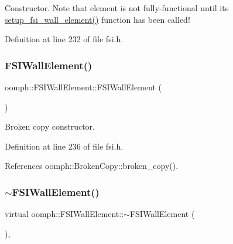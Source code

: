 Constructor. Note that element is not fully-\/functional until its \hyperlink{classoomph_1_1FSIWallElement_a487a050241512f3979c4d67bb40b2a63}{setup\+\_\+fsi\+\_\+wall\+\_\+element()} function has been called! 



Definition at line 232 of file fsi.\+h.

\mbox{\label{classoomph_1_1FSIWallElement_a57f70b2c656281853592a0163fa16268}} 
\subsubsection{\texorpdfstring{F\+S\+I\+Wall\+Element()}{FSIWallElement()}\hspace{0.1cm}{\footnotesize\ttfamily [2/2]}}
{\footnotesize\ttfamily oomph\+::\+F\+S\+I\+Wall\+Element\+::\+F\+S\+I\+Wall\+Element (\begin{DoxyParamCaption}\item[{const \hyperlink{classoomph_1_1FSIWallElement}{F\+S\+I\+Wall\+Element} \&}]{ }\end{DoxyParamCaption})\hspace{0.3cm}{\ttfamily [inline]}}



Broken copy constructor. 



Definition at line 236 of file fsi.\+h.



References oomph\+::\+Broken\+Copy\+::broken\+\_\+copy().

\mbox{\label{classoomph_1_1FSIWallElement_a498254a4b31cfee252a2015a754b03df}} 
\subsubsection{\texorpdfstring{$\sim$\+F\+S\+I\+Wall\+Element()}{~FSIWallElement()}}
{\footnotesize\ttfamily virtual oomph\+::\+F\+S\+I\+Wall\+Element\+::$\sim$\+F\+S\+I\+Wall\+Element (\begin{DoxyParamCaption}{ }\end{DoxyParamCaption})\hspace{0.3cm}{\ttfamily [inline]}, {\ttfamily [virtual]}}



